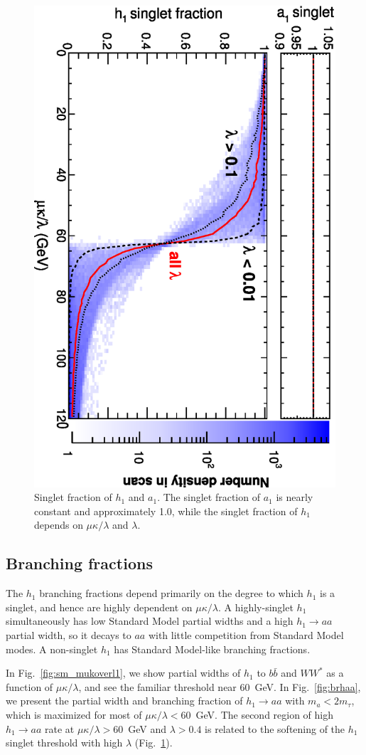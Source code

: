\documentclass[aps,12pt,superscriptaddress,nofootinbib,floatfix,showpacs]{revtex4}
\begin{document}
\begin{figure}
\includegraphics[height=0.7\linewidth, angle=90]{plots/newbranching/scomp13_vs_mkoverl.eps}
\caption{Singlet fraction of $h_1$ and $a_1$.  The singlet fraction of
  $a_1$ is nearly constant and approximately 1.0, while the singlet
  fraction of $h_1$ depends on $\mu\kappa/\lambda$ and $\lambda$. \label{fig:singlet}}
\end{figure}

\subsection{Branching fractions}

The $h_1$ branching fractions depend primarily on the degree to which
$h_1$ is a singlet, and hence are highly dependent on
$\mu\kappa/\lambda$.  A highly-singlet $h_1$ simultaneously has low
Standard Model partial widths and a high $h_1 \to aa$ partial width,
so it decays to $aa$ with little competition from Standard Model modes.
A non-singlet $h_1$ has Standard Model-like branching fractions.

In Fig.~\ref{fig:sm_mukoverl1}, we show partial widths of $h_1$ to
$b\bar{b}$ and $WW^*$ as a function of $\mu\kappa/\lambda$, and see
the familiar threshold near 60~GeV.  In Fig.~\ref{fig:brhaa}, we
present the partial width and branching fraction of $h_1 \to aa$ with
$m_a < 2m_\tau$, which is maximized for most of $\mu\kappa/\lambda <
60$~GeV.  The second region of high $h_1 \to aa$ rate at
$\mu\kappa/\lambda > 60$~GeV and $\lambda > 0.4$ is related to the
softening of the $h_1$ singlet threshold with high $\lambda$
(Fig.~\ref{fig:singlet}).
\end{document}
